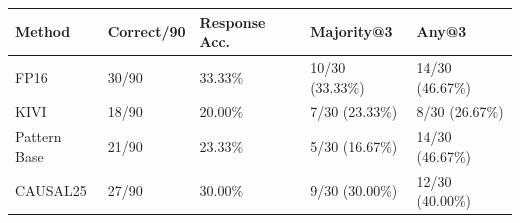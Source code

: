\begin{tabular}{lllll}
\toprule
Method & Correct/90 & Response Acc. & Majority@3 & Any@3 \\
\midrule
FP16 & 30/90 & 33.33\% & 10/30 (33.33\%) & 14/30 (46.67\%) \\
KIVI & 18/90 & 20.00\% & 7/30 (23.33\%) & 8/30 (26.67\%) \\
Pattern Base & 21/90 & 23.33\% & 5/30 (16.67\%) & 14/30 (46.67\%) \\
CAUSAL25 & 27/90 & 30.00\% & 9/30 (30.00\%) & 12/30 (40.00\%) \\
\bottomrule
\end{tabular}

